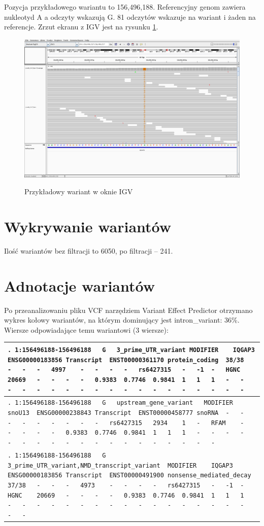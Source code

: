 \documentclass[a4paper]{article}
\begin{document}
Pozycja przykładowego wariantu to 156,496,188.
Referencyjny genom zawiera nukleotyd A a odczyty wskazują G.
81 odczytów wskazuje na wariant i żaden na referencje.
Zrzut ekranu z IGV jest na rysunku \ref{fig:igv}.

\begin{figure}[h]
    \centering
    \includegraphics[width=1.0\textwidth]{sampleVariant.png}
    \label{fig:igv}
    \caption[]{Przykładowy wariant w oknie IGV}
\end{figure}


\section{Wykrywanie wariantów}  

Ilość wariantów bez filtracji to 6050, po filtracji -- 241.

\section{Adnotacje wariantów}  
Po przeanalizowaniu pliku VCF narzędziem Variant Effect Predictor otrzymano wykres kołowy wariantów, na którym dominujący jest intron\_variant: 36\%.
Wiersze odpowiadające temu wariantowi (3 wiersze):


\begin{tabular}{| p{150mm} |}
    \hline
    \verb|.	1:156496188-156496188	G	3_prime_UTR_variant	MODIFIER	IQGAP3	ENSG00000183856	Transcript	ENST00000361170	protein_coding	38/38	-	-	-	4997	-	-	-	-	rs6427315	-	-1	-	HGNC	20669	-	-	-	-	0.9383	0.7746	0.9841	1	1	1	-	-	-	-	-	-	-	-	-	-	-	-	-	-	-	-	-	-	-|
    \\
    \hline
\verb|.	1:156496188-156496188	G	upstream_gene_variant	MODIFIER	snoU13	ENSG00000238843	Transcript	ENST00000458777	snoRNA	-	-	-	-	-	-	-	-	-	rs6427315	2934	1	-	RFAM	-	-	-	-	-	0.9383	0.7746	0.9841	1	1	1	-	-	-	-	-	-	-	-	-	-	-	-	-	-	-	-	-	-	-|
    \\
    \hline
\verb|.	1:156496188-156496188	G	3_prime_UTR_variant,NMD_transcript_variant	MODIFIER	IQGAP3	ENSG00000183856	Transcript	ENST00000491900	nonsense_mediated_decay	37/38	-	-	-	4973	-	-	-	-	rs6427315	-	-1	-	HGNC	20669	-	-	-	-	0.9383	0.7746	0.9841	1	1	1	-	-	-	-	-	-	-	-	-	-	-	-	-	-	-	-	-	-	-|
    \\
    \hline
\end{tabular}
\end{document}
